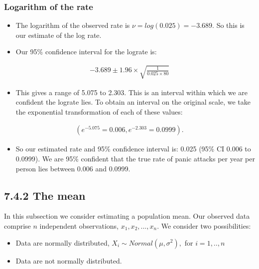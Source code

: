 \documentclass[letterpaper,10pt,english]{jupyterBook}
\begin{document}
\subsubsection*{Logarithm of the rate}
\begin{itemize}
\item {} 
\sphinxAtStartPar
The logarithm of the observed rate is \(\nu = log(0.025) = -3.689\). So this is our estimate of the log rate.

\item {} 
\sphinxAtStartPar
Our 95\% confidence interval for the log\sphinxhyphen{}rate is:

\end{itemize}
\begin{equation*}
\begin{split}
-3.689 \pm 1.96 \times \sqrt{\frac{1}{0.025 \times 80}}
\end{split}
\end{equation*}\begin{itemize}
\item {} 
\sphinxAtStartPar
This gives a range of \sphinxhyphen{}5.075 to \sphinxhyphen{}2.303. This is an interval within which we are confident the log\sphinxhyphen{}rate lies. To obtain an interval on the original scale, we take the exponential transformation of each of these values:

\end{itemize}
\begin{equation*}
\begin{split}
(e^{-5.075}=0.006, e^{-2.303}=0.0999).
\end{split}
\end{equation*}\begin{itemize}
\item {} 
\sphinxAtStartPar
So our estimated rate and 95\% confidence interval is: 0.025 (95\% CI 0.006 to 0.0999). We are 95\% confident that the true rate of panic attacks per year per person lies between 0.006 and 0.0999.

\end{itemize}


\subsection{7.4.2 The mean}
\label{\detokenize{07.e. Frequentist I:the-mean}}
\sphinxAtStartPar
In this subsection we consider estimating a population mean. Our observed data comprise \(n\) independent observations, \(x_1, x_2, ..., x_n\). We consider two possibilities:
\begin{itemize}
\item {} 
\sphinxAtStartPar
Data are normally distributed, \(X_i \sim Normal(\mu, \sigma^2),\) for \(i=1,..,n\)

\item {} 
\sphinxAtStartPar
Data are not normally distributed.

\end{itemize}
\end{document}
